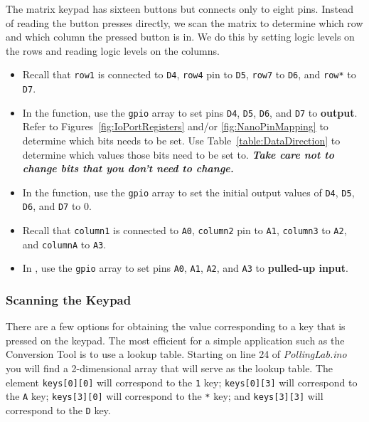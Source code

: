 The matrix keypad has sixteen buttons but connects only to eight pins. Instead
of reading the button presses directly, we scan the matrix to determine
which row and which column the pressed button is in. We do this by setting
logic levels on the rows and reading logic levels on the columns.

    \begin{itemize}
    \item Recall that \texttt{row1} is connected to \texttt{D4}, \texttt{row4}
        pin to \texttt{D5}, \texttt{row7} to \texttt{D6}, and \texttt{row*} to
        \texttt{D7}.
    \item In the  function, use the \lstinline{gpio}
        array to set pins \texttt{D4}, \texttt{D5}, \texttt{D6}, and
        \texttt{D7} to \textbf{output}. Refer to
        Figures~\ref{fig:IoPortRegisters} and/or \ref{fig:NanoPinMapping} to
        determine which bits needs to be set. Use
        Table~\ref{table:DataDirection} to determine which values those bits
        need to be set to. \textbf{\textit{Take care not to change bits that
        you don't need to change.}}
    \item In the  function, use the \lstinline{gpio}
        array to set the initial output values of \texttt{D4}, \texttt{D5},
        \texttt{D6}, and \texttt{D7} to 0.
    \item Recall that \texttt{column1} is connected to \texttt{A0},
        \texttt{column2} pin to \texttt{A1}, \texttt{column3} to \texttt{A2},
        and \texttt{columnA} to \texttt{A3}.
    \item In , use the \lstinline{gpio} array to
        set pins \texttt{A0}, \texttt{A1}, \texttt{A2}, and \texttt{A3} to
        \textbf{pulled-up input}.
    \end{itemize}

\subsubsection{Scanning the Keypad}

There are a few options for obtaining the value corresponding to a key that is
pressed on the keypad. The most efficient for a simple application such as the
Conversion Tool is to use a lookup table. Starting on line 24 of
\textit{PollingLab.ino} you will find a 2-dimensional array that will serve as
the lookup table. The element \lstinline{keys[0][0]} will correspond to the
\texttt{1} key; \lstinline{keys[0][3]} will correspond to the \texttt{A} key;
\lstinline{keys[3][0]} will correspond to the \texttt{*} key; and
\lstinline{keys[3][3]} will correspond to the \texttt{D} key.

